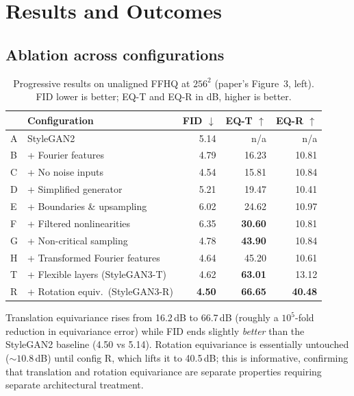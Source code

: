 \documentclass[11pt,a4paper]{article}
\begin{document}
\section{Results and Outcomes}

\subsection{Ablation across configurations}

\begin{table}[htbp]
\centering
\caption{Progressive results on unaligned FFHQ at $256^2$ (paper's Figure~3,
left). FID lower is better; EQ-T and EQ-R in dB, higher is better.}
\label{tab:configs}
\small
\begin{tabular}{llrrr}
\toprule
& \textbf{Configuration} & \textbf{FID} $\downarrow$ & \textbf{EQ-T} $\uparrow$ & \textbf{EQ-R} $\uparrow$ \\
\midrule
A & StyleGAN2                       & 5.14 & n/a & n/a \\
B & + Fourier features              & 4.79 & 16.23 & 10.81 \\
C & + No noise inputs               & 4.54 & 15.81 & 10.84 \\
D & + Simplified generator          & 5.21 & 19.47 & 10.41 \\
E & + Boundaries \& upsampling      & 6.02 & 24.62 & 10.97 \\
F & + Filtered nonlinearities       & 6.35 & \textbf{30.60} & 10.81 \\
G & + Non-critical sampling         & 4.78 & \textbf{43.90} & 10.84 \\
H & + Transformed Fourier features  & 4.64 & 45.20 & 10.61 \\
T & + Flexible layers (StyleGAN3-T) & 4.62 & \textbf{63.01} & 13.12 \\
R & + Rotation equiv.\ (StyleGAN3-R)& \textbf{4.50} & \textbf{66.65} & \textbf{40.48} \\
\bottomrule
\end{tabular}
\end{table}

Translation equivariance rises from 16.2\,dB to 66.7\,dB (roughly a
$10^{5}$-fold reduction in equivariance error) while FID ends slightly
\emph{better} than the StyleGAN2 baseline (4.50 vs 5.14). Rotation equivariance
is essentially untouched (${\sim}10.8$\,dB) until config R, which lifts it to
40.5\,dB; this is informative, confirming that translation and rotation
equivariance are separate properties requiring separate architectural treatment.
\end{document}
